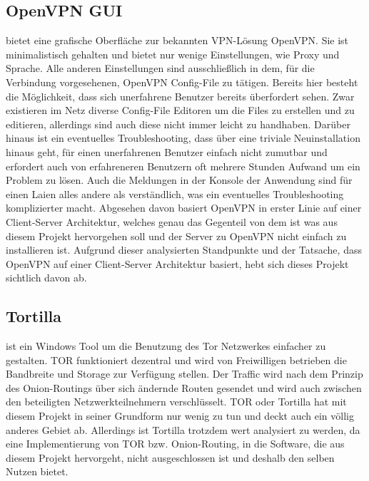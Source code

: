 \documentclass[a4paper,12pt]{scrreprt}
\begin{document}
	\subsection{OpenVPN GUI} bietet eine grafische Oberfläche zur bekannten VPN-Lösung OpenVPN. Sie ist minimalistisch gehalten und bietet nur wenige Einstellungen, wie Proxy und Sprache. Alle anderen Einstellungen sind ausschließlich in dem, für die Verbindung vorgesehenen, OpenVPN Config-File zu tätigen. Bereits hier besteht die Möglichkeit, dass sich unerfahrene Benutzer bereits überfordert sehen. Zwar existieren im Netz diverse Config-File Editoren um die Files zu erstellen und zu editieren, allerdings sind auch diese nicht immer leicht zu handhaben. Darüber hinaus ist ein eventuelles Troubleshooting, dass über eine triviale Neuinstallation hinaus geht, für einen unerfahrenen Benutzer einfach nicht zumutbar und erfordert auch von erfahreneren Benutzern oft mehrere Stunden Aufwand um ein Problem zu lösen. Auch die Meldungen in der Konsole der Anwendung sind für einen Laien alles andere als verständlich, was ein eventuelles Troubleshooting komplizierter macht. Abgesehen davon basiert OpenVPN in erster Linie auf einer Client-Server Architektur, welches genau das Gegenteil von dem ist was aus diesem Projekt hervorgehen soll und der Server zu OpenVPN nicht einfach zu installieren ist. Aufgrund dieser analysierten Standpunkte und der Tatsache, dass OpenVPN auf einer Client-Server Architektur basiert, hebt sich dieses Projekt sichtlich davon ab.
	
	\subsection{Tortilla} ist ein Windows Tool um die Benutzung des Tor Netzwerkes einfacher zu gestalten. TOR funktioniert dezentral und wird von Freiwilligen betrieben die Bandbreite und Storage zur Verfügung stellen. Der Traffic wird nach dem Prinzip des Onion-Routings über sich ändernde Routen gesendet und wird auch zwischen den beteiligten Netzwerkteilnehmern verschlüsselt. TOR oder Tortilla hat mit diesem Projekt in seiner Grundform nur wenig zu tun und deckt auch ein völlig anderes Gebiet ab. Allerdings ist Tortilla trotzdem wert analysiert zu werden, da eine Implementierung von TOR bzw. Onion-Routing, in die Software, die aus diesem Projekt hervorgeht, nicht ausgeschlossen ist und deshalb den selben Nutzen bietet.
	
\end{document}
